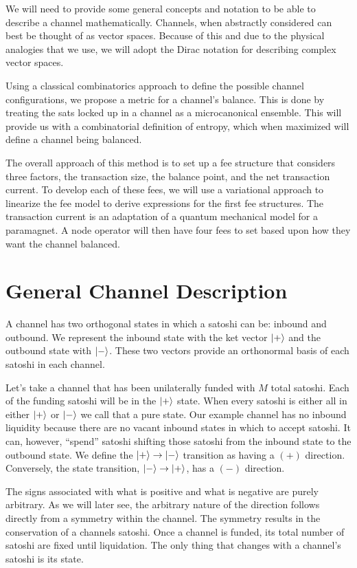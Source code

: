 \documentclass[review,12pt]{elsarticle}
\begin{document}
We will need to provide some general concepts and notation to be able to describe a channel mathematically.
Channels, when abstractly considered can best be thought of as vector spaces.
Because of this and due to the physical analogies that we use, we will adopt the Dirac notation for describing complex vector spaces.

Using a classical combinatorics approach to define the possible channel configurations, we propose a metric for a channel's balance.
This is done by treating the sats locked up in a channel as a microcanonical ensemble.
This will provide us with a combinatorial definition of entropy, which when maximized will define a channel being balanced.

The overall approach of this method is to set up a fee structure that considers three factors, the transaction size, the balance point, and the net transaction current.
To develop each of these fees, we will use a variational approach to linearize the fee model to derive expressions for the first fee structures.
The transaction current is an adaptation of a quantum mechanical model for a paramagnet.
A node operator will then have four fees to set based upon how they want the channel balanced.

\section{General Channel Description}
A channel has two orthogonal states in which a satoshi can be: inbound and outbound.
We represent the inbound state with the ket vector $\Ket{+}$ and the outbound state with $\Ket{-}$.
These two vectors provide an orthonormal basis of each satoshi in each channel.

Let's take a channel that has been unilaterally funded with $M$ total satoshi.
Each of the funding satoshi will be in the $\Ket{+}$ state.
When every satoshi is either all in either $\Ket{+}$ or $\Ket{-}$ we call that a pure state.
Our example channel has no inbound liquidity because there are no vacant inbound states in which to accept satoshi.
It can, however, ``spend'' satoshi shifting those satoshi from the inbound state to the outbound state.
We define the $\Ket{+}\rightarrow\Ket{-}$ transition as having a $(+)$ direction.
Conversely, the state transition, $\Ket{-}\rightarrow\Ket{+}$, has a $(-)$ direction.

The signs associated with what is positive and what is negative are purely arbitrary.
As we will later see, the arbitrary nature of the direction follows directly from a symmetry within the channel.
The symmetry results in the conservation of a channels satoshi.
Once a channel is funded, its total number of satoshi are fixed until liquidation.
The only thing that changes with a channel's satoshi is its state.
\end{document}
